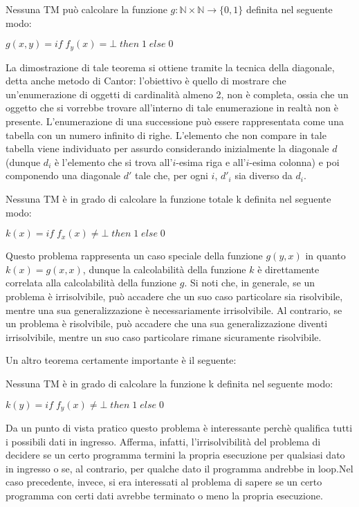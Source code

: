   \begin{theorem} 
    Nessuna TM può calcolare la funzione \(g:\mathbb N\times \mathbb N \to \{0,1\}\) definita nel seguente modo:
    
    \(g(x,y) = if\; f_y(x) = \bot \; then \; 1 \; else \; 0\)
  \end{theorem}

  La dimostrazione di tale teorema si ottiene tramite la tecnica della diagonale, detta anche metodo di Cantor: l'obiettivo è quello di mostrare che un'enumerazione di oggetti di cardinalità almeno 2, non è completa, ossia che un oggetto che si vorrebbe trovare all'interno di tale enumerazione in realtà non è presente. L'enumerazione di una successione può essere rappresentata come una tabella con un numero infinito di righe. L'elemento che non compare in tale tabella viene individuato per assurdo considerando inizialmente la diagonale \(d\) (dunque \(d_i\) è l'elemento che si trova all'\(i\)-esima riga e all'\(i\)-esima colonna) e poi componendo una diagonale \(d'\) tale che, per ogni \(i\), \(d'_i\) sia diverso da \(d_i\).
  
  \begin{theorem}
    Nessuna TM è in grado di calcolare la funzione totale k definita nel seguente modo:

    \(k(x)= if\;f_x(x)\neq\bot\;then\;1\;else\;0\)
  \end{theorem}

  Questo problema rappresenta un caso speciale della funzione \(g(y,x)\) in quanto \(k(x)=g(x,x)\), dunque la calcolabilità della funzione \(k\) è direttamente correlata alla calcolabilità della funzione \(g\).
  Si noti che, in generale, se un problema è irrisolvibile, può accadere che un suo caso particolare sia risolvibile, mentre una sua generalizzazione è necessariamente irrisolvibile. Al contrario, se un problema è risolvibile, può accadere che una sua generalizzazione diventi irrisolvibile, mentre un suo caso particolare rimane sicuramente risolvibile.

  Un altro teorema certamente importante è il seguente:
  \begin{theorem}
    Nessuna TM è in grado di calcolare la funzione k definita nel seguente modo:

    \(k(y)=if\; f_y(x)\neq\bot\;then\;1\;else\;0\)
  \end{theorem}
  
  Da un punto di vista pratico questo problema è interessante perchè qualifica tutti i possibili dati in ingresso. Afferma, infatti, l'irrisolvibilità del problema di decidere se un certo programma termini la propria esecuzione per qualsiasi dato in ingresso o se, al contrario, per qualche dato il programma andrebbe in loop.Nel caso precedente, invece, si era interessati al problema di sapere se un certo programma con certi dati avrebbe terminato o meno la propria esecuzione.
  
